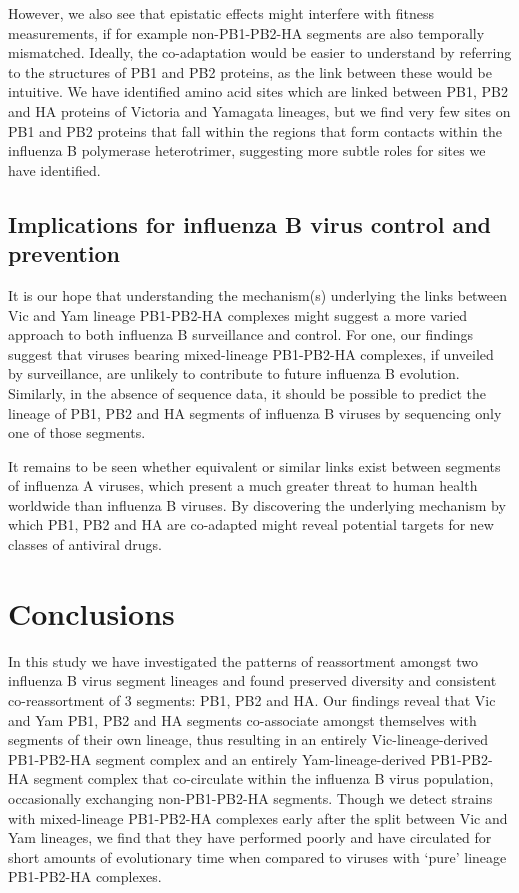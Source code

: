 \documentclass[11pt,oneside,letterpaper]{article}
\begin{document}
However, we also see that epistatic effects might interfere with fitness measurements, if for example non-PB1-PB2-HA segments are also temporally mismatched.
Ideally, the co-adaptation would be easier to understand by referring to the structures of PB1 and PB2 proteins, as the link between these would be intuitive.
We have identified amino acid sites which are linked between PB1, PB2 and HA proteins of Victoria and Yamagata lineages, but we find very few sites on PB1 and PB2 proteins that fall within the regions that form contacts within the influenza B polymerase heterotrimer, suggesting more subtle roles for sites we have identified.

\subsection*{Implications for influenza B virus control and prevention}
It is our hope that understanding the mechanism(s) underlying the links between Vic and Yam lineage PB1-PB2-HA complexes might suggest a more varied approach to both influenza B surveillance and control.
For one, our findings suggest that viruses bearing mixed-lineage PB1-PB2-HA complexes, if unveiled by surveillance, are unlikely to contribute to future influenza B evolution.
Similarly, in the absence of sequence data, it should be possible to predict the lineage of PB1, PB2 and HA segments of influenza B viruses by sequencing only one of those segments.

It remains to be seen whether equivalent or similar links exist between segments of influenza A viruses, which present a much greater threat to human health worldwide than influenza B viruses.
By discovering the underlying mechanism by which PB1, PB2 and HA are co-adapted might reveal potential targets for new classes of antiviral drugs.

\section*{Conclusions}
In this study we have investigated the patterns of reassortment amongst two influenza B virus segment lineages and found preserved diversity and consistent co-reassortment of 3 segments: PB1, PB2 and HA.
Our findings reveal that Vic and Yam PB1, PB2 and HA segments co-associate amongst themselves with segments of their own lineage, thus resulting in an entirely Vic-lineage-derived PB1-PB2-HA segment complex and an entirely Yam-lineage-derived PB1-PB2-HA segment complex that co-circulate within the influenza B virus population, occasionally exchanging non-PB1-PB2-HA segments.
Though we detect strains with mixed-lineage PB1-PB2-HA complexes early after the split between Vic and Yam lineages, we find that they have performed poorly and have circulated for short amounts of evolutionary time when compared to viruses with `pure' lineage PB1-PB2-HA complexes.
\end{document}

